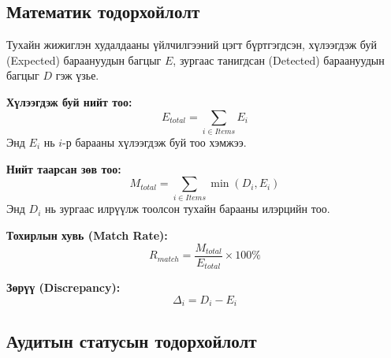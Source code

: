 \subsection{Математик тодорхойлолт}

Тухайн жижиглэн худалдааны үйлчилгээний цэгт бүртгэгдсэн, хүлээгдэж буй (Expected) бараануудын багцыг $E$, зургаас танигдсан (Detected) бараануудын багцыг $D$ гэж үзье.

\textbf{Хүлээгдэж буй нийт тоо:}
\begin{equation}
    E_{total} = \sum_{i \in Items} E_i
\end{equation}
Энд $E_i$ нь $i$-р барааны хүлээгдэж буй тоо хэмжээ.

\textbf{Нийт таарсан зөв тоо:}
\begin{equation}
    M_{total} = \sum_{i \in Items} \min(D_i, E_i)
\end{equation}
Энд $D_i$ нь зургаас илрүүлж тоолсон тухайн барааны илэрцийн тоо.

\textbf{Тохирлын хувь (Match Rate):}
\begin{equation}
    R_{match} = \frac{M_{total}}{E_{total}} \times 100\%
\end{equation}

\textbf{Зөрүү (Discrepancy):}
\begin{equation}
    \Delta_i = D_i - E_i
\end{equation}

\subsection{Аудитын статусын тодорхойлолт}

